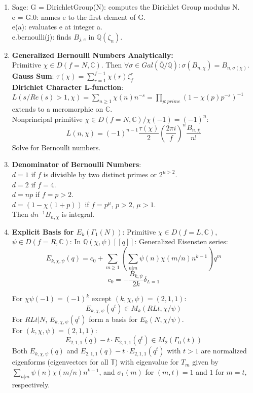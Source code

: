 \documentclass{article}
\newcommand{\Q}{\mathbb{Q}}
\newcommand{\C}{\mathbb{C}}
\begin{document}
\begin{multicols}{2}
\begin{enumerate}
\item Sage:
G = DirichletGroup(N): computes the Dirichlet Group modulus N.\\
e = G.0: names e to the first element of G.\\
e(a): evaluates e at integer a.\\
e.bernoulli(j): finds $B_{j,e}$ in $\Q(\zeta_n)$.


\item \textbf{Generalized Bernoulli Numbers Analytically:}\\
Primitive $\chi \in D(f = N,\C)$. Then $\forall \sigma \in Gal(\overline{\Q}/\Q): \sigma(B_{n,\chi})= B_{n,\sigma(\chi)}$.\\
\textbf{Gauss Sum}: $\tau(\chi) = \sum_{r=1}^{f-1} \chi(r)\zeta_f^r$ \\
\textbf{Dirichlet Character L-function}: $L(s/ Re(s) > 1,\chi) = \sum_{n \geq 1} \chi(n) n^{-s} = \prod_{p:prime} (1- \chi(p)p^{-s})^{-1}$ extends to a meromorphic on $\C$.\\

Nonprincipal primitive $\chi \in D(f = N,\C)/\chi(-1) = (-1)^n$: 
\[L(n,\chi) = (-1)^{n-1}\frac{\tau(\chi)}{2} \left(\frac{2\pi i}{f}\right)^n \frac{B_{n,\overline{\chi}}}{n!}\]
Solve for Bernoulli numbers. 

\item \textbf{Denominator of Bernoulli Numbers}: \\
$d = 1$ if $f$ is divisible by two distinct primes or $2^{\mu > 2}$.\\
$d = 2$ if $f = 4$.\\
$d = np$ if $f = p > 2$.\\
$d = (1 - \chi(1+p))$ if $f = p^\mu$, $p > 2$, $\mu > 1$.\\
Then $dn^{-1}B_{n,\chi}$ is integral. 


\item \textbf{Explicit Basis for $E_k(\Gamma_1(N))$}: Primitive $\chi \in D(f = L,\C)$,$\psi \in D(f = R, \C)$: In $\Q(\chi,\psi)[[q]]$: Generalized Eisensten series:
\[E_{k,\chi,\psi}(q) = c_0 + \sum_{m \geq 1} \left(\sum_{n|m} \psi(n) \chi(m/n) n^{k-1} \right)q^m\]
\[c_0 = -\frac{B_{k,\psi}}{2k} \delta_{L = 1}\]

For $\chi \psi(-1) = (-1)^k$ except $(k,\chi,\psi) = (2,1,1)$: 
\[E_{k,\chi,\psi}(q^t) \in M_k(RLt, \chi/\psi)\]
For $RLt|N$, $E_{k,\chi,\psi}(q^t)$ form a basis for $E_k(N,\chi/\psi)$. \\
For $(k,\chi,\psi) = (2,1,1)$: 
\[E_{2,1,1}(q) - t \cdot E_{2,1,1}(q^t) \in M_2(\Gamma_0(t))\]
Both $E_{k,\chi,\psi}(q)$ and $E_{2,1,1}(q) - t \cdot E_{2,1,1}(q^t)$ with $t > 1$ are normalized eigenforms (eigenvectors for all $\mathbb{T}$) with eigenvalue for $T_m$ given by $\sum_{n|m} \psi(n) \chi(m/n) n^{k-1}$, and $\sigma_1(m)$ for $(m,t) = 1$ and $1$ for $m = t$, respectively.


\end{enumerate}
\end{multicols}
\end{document}

